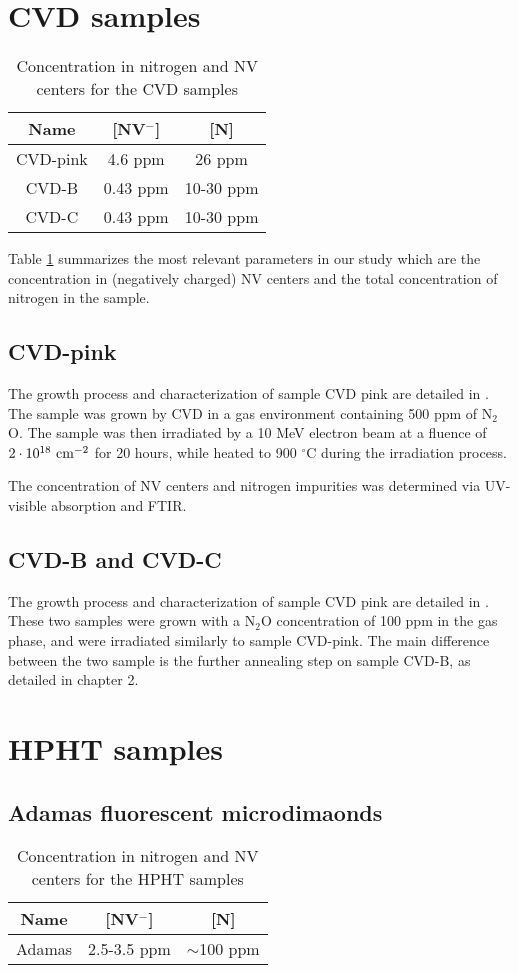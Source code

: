 \documentclass[a4paper, 11pt]{report}
\begin{document}
\section{CVD samples}
\begin{table}[htbp]
\centering
\caption{Concentration in nitrogen and NV centers for the CVD samples}
\label{Table samples CVD}
\begin{tabular}{c|cc}
\toprule
Name &  [NV$^-$]  & [N] \\
\midrule
CVD-pink & 4.6 ppm & 26 ppm \\
CVD-B & 0.43 ppm & 10-30 ppm \\
CVD-C & 0.43 ppm & 10-30 ppm \\

\bottomrule
\end{tabular}
\end{table}
Table \ref{Table samples CVD} summarizes the most relevant parameters in our study which are the concentration in (negatively charged) NV centers and the total concentration of nitrogen in the sample.
\subsection{CVD-pink}
The growth process and characterization of sample CVD pink are detailed in \citep{tallaire2020high}. The sample was grown by CVD in a gas environment containing 500 ppm of N$_2$O. The sample was then irradiated by a 10 MeV electron beam at a fluence of $2\cdot 10^{18}\ \rm cm^{-2}$ for 20 hours, while heated to 900 $^\circ$C during the irradiation process.

The concentration of NV centers and nitrogen impurities was determined via UV-visible absorption and FTIR.

\subsection{CVD-B and CVD-C}
The growth process and characterization of sample CVD pink are detailed in \citep{ngambou2022improving}. These two samples were grown with a N$_2$O concentration of 100 ppm in the gas phase, and were irradiated similarly to sample CVD-pink. The main difference between the two sample is the further annealing step on sample CVD-B, as detailed in chapter 2.

\section{HPHT samples}
\subsection{Adamas fluorescent microdimaonds}
\begin{table}[htbp]
\centering
\caption{Concentration in nitrogen and NV centers for the HPHT samples}
\label{Table samples adamas}
\begin{tabular}{c|cc}
\toprule
Name &  [NV$^-$] & [N] \\
\midrule
Adamas & 2.5-3.5 ppm & $\sim$100 ppm \\

\bottomrule
\end{tabular}
\end{table}
\end{document}
